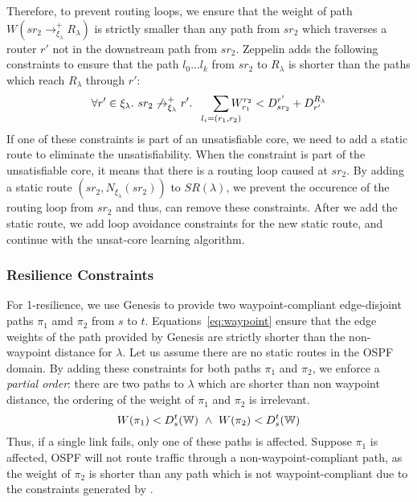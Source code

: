 Therefore, to prevent routing loops, we ensure that the weight
of path $W(sr_2 \rightarrow^+_{\xi_\lambda} R_\lambda)$ is 
strictly smaller than any path from $sr_2$ which traverses a
router $r'$ not in the downstream path from $sr_2$. Zeppelin
adds the following constraints to ensure that the path $l_0...l_k$
from $sr_2$ to $R_\lambda$ is shorter than the paths which reach 
$R_\lambda$ through $r'$: 
\begin{equation}
\forall r' \in \xi_\lambda. ~sr_2 \not\rightarrow_{\xi_\lambda}^+ r'. 
~~~~~\sum_{\mathclap{\substack{l_i=(r_1,r_2)}}} 
W_{r_1}^{r_2} < D^{r'}_{sr_2} + D_{r'}^{R_\lambda} 
\end{equation}
If one of these constraints is part of an unsatisfiable
core, we need to add a static route to eliminate the 
unsatisfiability. When the constraint is part of the 
unsatisfiable core, it means that there is a routing 
loop caused at $sr_2$. By adding a static route 
$(sr_2, N_{\xi_\lambda}(sr_2))$ to $SR(\lambda)$, we prevent
the occurence of the routing loop from $sr_2$ and thus, can
remove these constraints. After we add the static route,
we add loop avoidance constraints for the new static
route, and continue with the unsat-core learning algorithm. 

\subsubsection{Resilience Constraints} \label{sec:ospfresilience}
For 1-resilience, we use Genesis to provide two waypoint-compliant 
edge-disjoint paths $\pi_1$ amd $\pi_2$ from $s$ to $t$.
Equations~\ref{eq:waypoint} ensure that the edge weights 
of the path provided by Genesis are strictly shorter than 
the non-waypoint distance for $\lambda$. 
Let us assume there are no static routes in the 
OSPF domain. By adding these
constraints for both paths $\pi_1$ and $\pi_2$, 
we enforce a \emph{partial order}: there are two paths to $\lambda$
which are shorter than non waypoint distance, the 
ordering of the weight of $\pi_1$ and $\pi_2$ is irrelevant. 
\begin{equation} \label{eq:resilience}
W(\pi_1) < D^t_s(\mathbb{W}) ~\wedge~ W(\pi_2) < D^t_s(\mathbb{W}) 
\end{equation}
Thus, if a single link fails, only one 
of these paths is affected. Suppose
$\pi_1$ is affected, OSPF will not route traffic through a  
non-waypoint-compliant path, as the weight of $\pi_2$ is shorter than any path which is not waypoint-compliant due to the constraints generated 
by \name.

